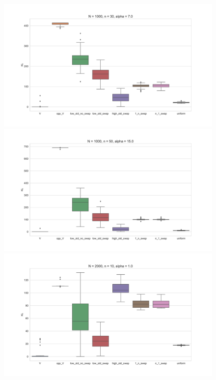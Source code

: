 \documentclass[11pt, oneside]{article}   	%
\begin{document}
\begin{figure}[h!]
\begin{minipage}[t]{.23\textwidth}
	\end{minipage} 
	\begin{minipage}[t]{.23\textwidth}
		\centering
		\includegraphics[width=\textwidth]{figures/theorem2_2/N1000n30alpha7.pdf}
		
	\end{minipage}
	\hfill
	\begin{minipage}[t]{.23\textwidth}
		\centering
		\includegraphics[width=\textwidth]{figures/theorem2_2/N1000n50alpha15.pdf}
		
	\end{minipage} 


	\begin{minipage}[t]{.23\textwidth}
			\centering
			\includegraphics[width=\textwidth]{figures/theorem2_2/N2000n10alpha1.pdf}
			

\end{minipage}
\end{figure}
\end{document}
